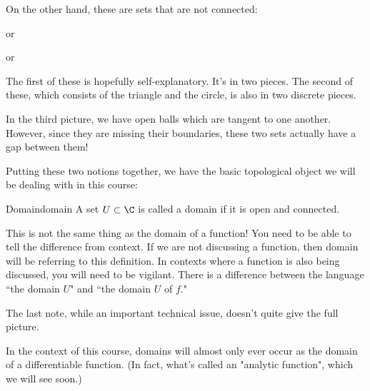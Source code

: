 On the other hand, these are sets that are not connected:

\begin{center}
\qquad or \qquad
{}
\qquad or \qquad
{}
\end{center}

The first of these is hopefully self-explanatory. It's in two pieces. The second of these, which consists of the triangle and the circle, is also in two discrete pieces.

In the third picture, we have open balls which are tangent to one another. However, since they are missing their boundaries, these two sets actually have a gap between them!

Putting these two notions together, we have the basic topological object we will be dealing with in this course:

\begin{defbo}{Domain}{domain}
A set $U\subset \C$ is called a domain if it is open and connected.
\end{defbo}

\begin{note} This is not the same thing as the domain of a function! You need to be able to tell the difference from context. If we are not discussing a function, then domain will be referring to this definition. In contexts where a function is also being discussed, you will need to be vigilant. There is a difference between the language ``the domain $U$" and ``the domain $U$ of $f$."\end{note}

\begin{note} The last note, while an important technical issue, doesn't quite give the full picture.

In the context of this course, domains will almost only ever occur as the domain of a differentiable function. (In fact, what's called an "analytic function", which we will see soon.)
\end{note}

